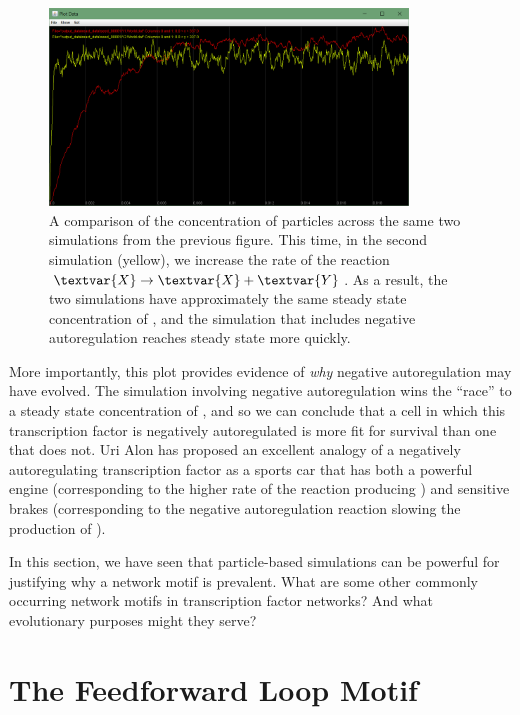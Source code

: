 \begin{figure}[h]
\centering
\mySfFamily
\includegraphics[width = 0.85\textwidth]{../images/nar_equal_chart.png}
\caption{A comparison of the concentration of  particles across the same two simulations from the previous figure. This time, in the second simulation (yellow), we increase the rate of the reaction $\textvar{X} \rightarrow \textvar{X} + \textvar{Y}$.  As a result, the two simulations have approximately the same steady state concentration of , and the simulation that includes negative autoregulation reaches steady state more quickly.}
\label{fig:nar_equal_chart}
\end{figure}

More importantly, this plot provides evidence of \textit{why} negative autoregulation may have evolved. The simulation involving negative autoregulation wins the ``race'' to a steady state concentration of , and so we can conclude that a cell in which this transcription factor is negatively autoregulated is more fit for survival than one that does not. Uri Alon has proposed an excellent analogy of a negatively autoregulating transcription factor as a sports car that has both a powerful engine (corresponding to the higher rate of the reaction producing ) and sensitive brakes (corresponding to the negative autoregulation reaction slowing the production of ).

In this section, we have seen that particle-based simulations can be powerful for justifying why a network motif is prevalent. What are some other commonly occurring network motifs in transcription factor networks? And what evolutionary purposes might they serve?\\


\FloatBarrier
{}

\section{The Feedforward Loop Motif}
\label{sec:the_feedforward_loop_motif}


